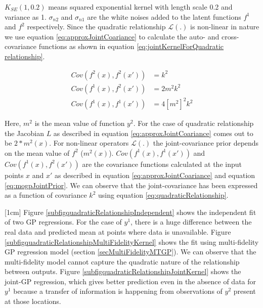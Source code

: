 \(K_{SE}(1, 0.2)\) means squared exponential kernel with length scale 0.2 and variance as 1. \(\sigma_{n2}\) and \(\sigma_{n1}\) are the white noises added to the latent functions \(f^{1}\) and \(f^{2}\) respectively. Since the quadratic relationship \(\mathcal{L}(.)\) is non-linear in nature we use equation \ref{eq:approxJointCoariance} to calculate the auto- and cross-covariance functions as shown in equation \ref{eq:jointKernelForQuadratic relationship}. 

\begin{equation}\label{eq:jointKernelForQuadratic relationship}
    \begin{aligned}
Cov(f^2(x), f^2(x')) & = k^{2} \\    
Cov(f^1(x), f^2(x')) & = 2m^{2} k^{2} \\
Cov(f^1(x), f^1(x')) & = 4 \left [m^{2} \right ]^2 k^{2}
    \end{aligned}
\end{equation}

Here, \(m^2\) is the mean value of function \(y^{2}\). For the case of quadratic relationship the Jacobian \(L\) as described in equation \ref{eq:approxJointCoariance} comes out to be \(2* m^2(x)\). For non-linear operators \(\mathcal{L}(.)\) the joint-covariance prior depends on the mean value of \(f^{2}\) ($m^2(x)$). \(Cov(f^1(x), f^1(x'))\) and \(Cov(f^1(x), f^2(x'))\) are the covariance functions calculated at the input points \(x\) and \(x'\) as described in equation \ref{eq:approxJointCoariance} and equation \ref{eq:mogpJointPrior}. We can observe that the joint-covariance has been expressed as a function of covariance \(k^2\) using equation \ref{eq:quadraticRelationship}.  

[1cm]
Figure \ref{subfigquadraticRelationshipIndependent} shows the independent fit of two GP regressions. For the case of \(y^{1}\), there is a huge difference between the real data and predicted mean at points where data is unavailable. Figure \ref{subfigquadraticRelationshipMultiFidelityKernel} shows the fit using multi-fidelity GP regression model (section \ref{secMultiFidelityMTGP}). We can observe that the multi-fidelity model cannot capture the quadratic nature of the relationship between outputs. Figure \ref{subfigquadraticRelationshipJointKernel} shows the joint-GP regression, which gives better prediction even in the absence of data for \(y^{1}\) because a transfer of information is happening from observations of \(y^{2}\) present at those locations. 

